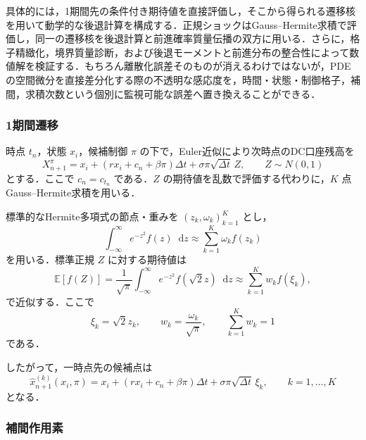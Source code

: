 \documentclass[10pt,a4paper]{article}
\theoremstyle{plain}
\theoremstyle{definition}
\newcommand{\E}{\mathbb{E}}
\newcommand{\dd}{\mathop{}\!\mathrm{d}}
\begin{document}
具体的には，1期間先の条件付き期待値を直接評価し，そこから得られる遷移核を用いて動学的な後退計算を構成する．正規ショックはGauss--Hermite求積で評価し，同一の遷移核を後退計算と前進確率質量伝播の双方に用いる．さらに，格子精緻化，境界質量診断，および後退モーメントと前進分布の整合性によって数値解を検証する．もちろん離散化誤差そのものが消えるわけではないが，PDEの空間微分を直接差分化する際の不透明な感応度を，時間・状態・制御格子，補間，求積次数という個別に監視可能な誤差へ置き換えることができる．

\subsubsection{1期間遷移}

時点 $t_n$，状態 $x_i$，候補制御 $\pi$ の下で，Euler近似により次時点のDC口座残高を
\begin{equation}
  X_{n+1}^{\pi}
  =x_i+(rx_i+c_n+\beta\pi)\Delta t+\sigma\pi\sqrt{\Delta t}\,Z,
  \qquad Z\sim N(0,1)
  \label{eq:euler-transition}
\end{equation}
とする．ここで $c_n=c_{t_n}$ である．$Z$ の期待値を乱数で評価する代わりに，$K$ 点Gauss--Hermite求積を用いる．

標準的なHermite多項式の節点・重みを $(z_k,\omega_k)_{k=1}^K$ とし，
\begin{equation}
  \int_{-\infty}^{\infty} e^{-z^2}f(z)\dd z
  \approx
  \sum_{k=1}^K\omega_k f(z_k)
  \label{eq:gh-basic}
\end{equation}
を用いる．標準正規 $Z$ に対する期待値は
\begin{equation}
  \E[f(Z)]
  =\frac{1}{\sqrt{\pi}}\int_{-\infty}^{\infty}e^{-z^2}f(\sqrt{2}z)\dd z
  \approx
  \sum_{k=1}^K w_k f(\xi_k),
  \label{eq:gh-normal}
\end{equation}
で近似する．ここで
\begin{equation}
  \xi_k=\sqrt{2}z_k,
  \qquad
  w_k=\frac{\omega_k}{\sqrt{\pi}},
  \qquad
  \sum_{k=1}^K w_k=1
  \label{eq:gh-nodes}
\end{equation}
である．

したがって，一時点先の候補点は
\begin{equation}
  \widehat{x}_{n+1}^{(k)}(x_i,\pi)
  =x_i+(rx_i+c_n+\beta\pi)\Delta t
  +\sigma\pi\sqrt{\Delta t}\,\xi_k,
  \qquad k=1,\ldots,K
  \label{eq:transition-gh-nodes}
\end{equation}
となる．

\subsubsection{補間作用素}
\end{document}
